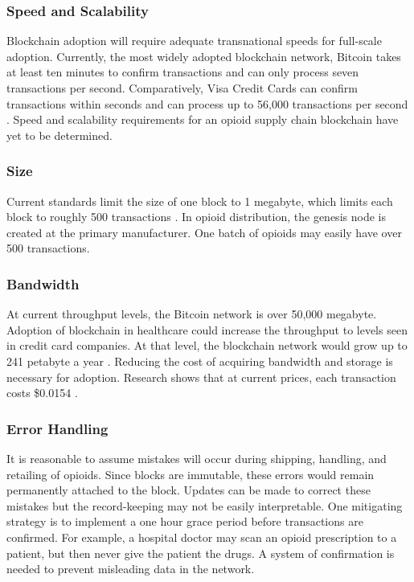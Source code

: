 \documentclass[sigconf]{acmart}
\begin{document}
\subsubsection{Speed and Scalability} Blockchain adoption will require adequate transnational speeds for full-scale adoption. Currently, the most widely adopted blockchain network, Bitcoin takes at least ten minutes to confirm transactions and can only process seven transactions per second. Comparatively, Visa Credit Cards can confirm transactions within seconds and can process up to 56,000 transactions per second \cite{Croman01}. Speed and scalability requirements for an opioid supply chain blockchain have yet to be determined.

\subsubsection{Size} Current standards limit the size of one block to 1 megabyte, which limits each block to roughly 500 transactions \cite{Yli01}. In opioid distribution, the genesis node is created at the primary manufacturer. One batch of opioids may easily have over 500 transactions. 

\subsubsection{Bandwidth} At current throughput levels, the Bitcoin network is over 50,000 megabyte. Adoption of blockchain in healthcare could increase the throughput to levels seen in credit card companies. At that level, the blockchain network would grow up to 241 petabyte a year \cite{Yli01}. Reducing the cost of acquiring bandwidth and storage is necessary for adoption. Research shows that at current prices, each transaction costs \$0.0154 \cite{Croman01}.

\subsubsection{Error Handling} It is reasonable to assume mistakes will occur during shipping, handling, and retailing of opioids. Since blocks are immutable, these errors would remain permanently attached to the block. Updates can be made to correct these mistakes but the record-keeping may not be easily interpretable. One mitigating strategy is to implement a one hour grace period before transactions are confirmed. For example, a hospital doctor may scan an opioid prescription to a patient, but then never give the patient the drugs. A system of confirmation is needed to prevent misleading data in the network. 
\end{document}
